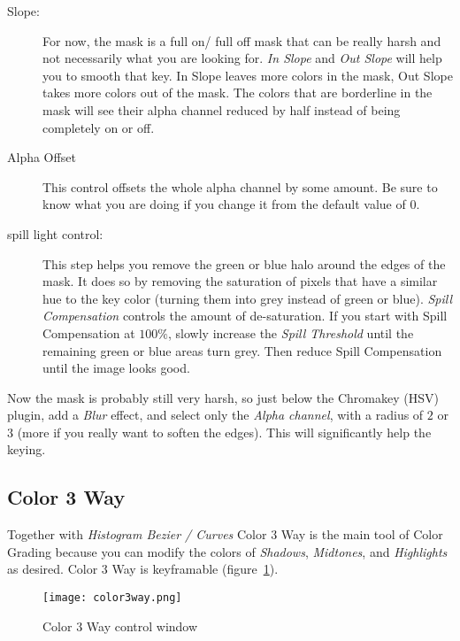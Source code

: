 \begin{description}
    \item[Slope:] For now, the mask is a full on/ full off mask that can be really harsh and not necessarily what you are looking for. \textit{In Slope} and \textit{Out Slope} will help you to smooth that key. In Slope leaves more colors in the mask, Out Slope takes more colors out of the mask. The colors that are borderline in the mask will see their alpha channel reduced by half instead of being completely on or off.
    \item[Alpha Offset] This control offsets the whole alpha channel by some amount. Be sure to know what you are doing if you change it from the default value of $0$.
    \item[spill light control:] This step helps you remove the green or blue halo around the edges of the mask. It does so by removing the saturation of pixels that have a similar hue to the key color (turning them into grey instead of green or blue). \textit{Spill Compensation} controls the amount of de-saturation. If you start with Spill Compensation at $100\%$, slowly increase the \textit{Spill Threshold} until the remaining green or blue areas turn grey. Then reduce Spill Compensation until the image looks good.
\end{description}

Now the mask is probably still very harsh, so just below the Chromakey (HSV) plugin, add a \textit{Blur} effect, and select only the \textit{Alpha channel}, with a radius of $2$ or $3$ (more if you really want to soften the edges). This will significantly help the keying.

\subsection{Color 3 Way}%
\label{sub:color_3_way}

Together with \textit{Histogram Bezier / Curves} Color 3 Way is the main tool of Color Grading because you can modify the colors of \textit{Shadows}, \textit{Midtones}, and \textit{Highlights} as desired. Color 3 Way is keyframable (figure~\ref{fig:color3way}).

\begin{figure}[htpb]
    \centering
    \texttt{[image: color3way.png]}
    \caption{Color 3 Way control window}
    \label{fig:color3way}
\end{figure}

